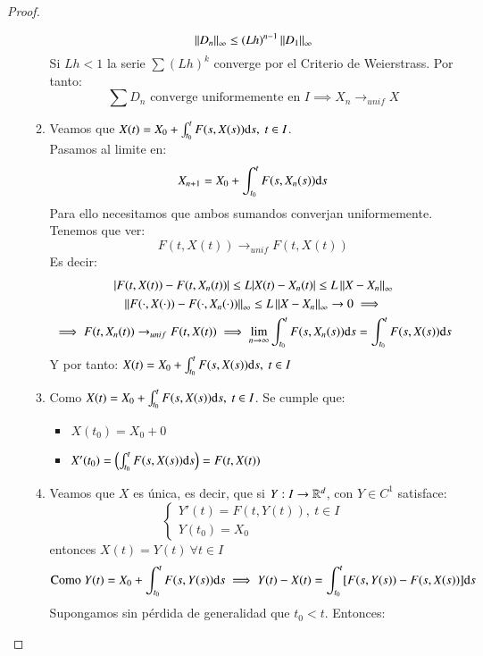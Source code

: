 \begin{proof}
\begin{enumerate}
\begin{enumerate}
        $$
            \left|\left|D_n\right|\right|_\infty \leq (Lh)^{n-1} \left|\left|D_1\right|\right|_\infty
        $$
        Si $Lh < 1$ la serie $\sum (Lh)^k$ converge por el Criterio de Weierstrass. Por tanto:
        $$
            \sum D_n \text{ converge uniformemente en } I \implies X_n\to_{unif} X
        $$
        \item Veamos que $X(t) = X_0 + \int_{t_0}^t F(s, X(s)) \mathrm{d} s,\ t\in I$.\\
        Pasamos al limite en:
        $$
            X_{n+1} = X_0 + \int_{t_0}^t F(s, X_{n}(s)) \mathrm{d} s
        $$
        Para ello necesitamos que ambos sumandos converjan uniformemente. Tenemos que ver:
        $$
            F(t, X(t)) \to_{unif} F(t, X(t))
        $$
        Es decir:
        \begin{gather*}
            |F(t, X(t)) - F(t, X_n(t))| \leq L |X(t) - X_n(t)| \leq L\left|\left|X-X_n\right|\right|_\infty\\
            \left|\left|F(\cdot, X(\cdot)) - F(\cdot, X_n(\cdot))\right|\right|_\infty \leq L \left|\left|X - X_n\right|\right|_\infty \to 0 \implies\\
            \implies F(t, X_n(t)) \to_{unif} F(t, X(t)) \implies \lim_{n\to \infty} \int_{t_0}^t F(s, X_n(s)) \mathrm{d} s = \int_{t_0}^t F(s, X(s)) \mathrm{d} s
        \end{gather*}
        Y por tanto:  $X(t) = X_0 + \int_{t_0}^t F(s, X(s)) \mathrm{d} s,\ t\in I$
        \item Como $X(t) = X_0 + \int_{t_0}^t F(s, X(s)) \mathrm{d} s,\ t\in I$. Se cumple que:\\
            \begin{itemize}
                \item $X(t_0) = X_0 + 0$
                \item $X'(t_0) = \left( \int_{t_0}^t F(s, X(s)) \mathrm{d} s \right) = F(t, X(t))$
            \end{itemize}
        \item Veamos que $X$ es única, es decir, que si $Y: I \to \mathbb{R}^d$, con $Y \in C^1$ satisface:
        $$
                \begin{cases}
                    Y'(t) = F(t, Y(t)),\ t\in I\\
                    Y(t_0) = X_0
                \end{cases}
        $$ entonces $X(t) = Y(t) \ \forall t \in I$\\
        $$
            \text{Como } Y(t) = X_0 + \int_{t_0}^t F(s, Y(s)) \mathrm{d} s \implies Y(t) - X(t) = \int_{t_0}^t [F(s, Y(s)) - F(s, X(s))] \mathrm{d} s
        $$
        Supongamos sin pérdida de generalidad que $t_0 < t$. Entonces:

\end{enumerate}
\end{enumerate}
\end{proof}
